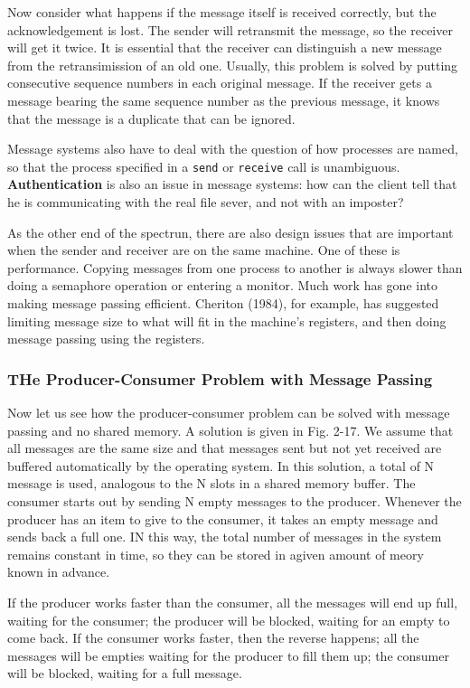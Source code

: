 \documentclass{book}
\newcommand {\kw}  [1] {\textbf{#1}}
\newcommand {\cmd} [1] {\texttt{#1}}
\begin{document}
Now consider what happens if the message itself is received correctly, but the acknowledgement is lost.
The sender will retransmit the message, so the receiver will get it twice.
It is essential that the receiver can distinguish a new message from the retransimission of an old one.
Usually, this problem is solved by putting consecutive sequence numbers in each original message.
If the receiver gets a message bearing the same sequence number as the previous message,
it knows that the message is a duplicate that can be ignored.

Message systems also have to deal with the question of how processes are named,
so that the process specified in a \cmd{send} or \cmd{receive} call is unambiguous.
\kw{Authentication} is also an issue in message systems:
how can the client tell that he is communicating with the real file sever, and not with an imposter?

As the other end of the spectrun, there are also design issues that are important when the sender and receiver are on the same machine.
One of these is performance.
Copying messages from one process to another is always slower than doing a semaphore operation or entering a monitor.
Much work has gone into making message passing efficient.
Cheriton (1984), for example, has suggested limiting message size to what will fit in the machine's registers,
and then doing message passing using the registers.

\subsubsection*{THe Producer-Consumer Problem with Message Passing}
Now let us see how the producer-consumer problem can be solved with message passing and no shared memory.
A solution is given in Fig. 2-17.
We assume that all messages are the same size and that messages sent but not yet received are buffered automatically by the operating system.
In this solution, a total of N message is used, analogous to the N slots in a shared memory buffer.
The consumer starts out by sending N empty messages to the producer.
Whenever the producer has an item to give to the consumer, it takes an empty message and sends back a full one.
IN this way, the total number of messages in the system remains constant in time, 
so they can be stored in agiven amount of meory known in advance.

If the producer works faster than the consumer, all the messages will end up full, waiting for the consumer;
the producer will be blocked, waiting for an empty to come back.
If the consumer works faster, then the reverse happens;
all the messages will be empties waiting for the producer to fill them up; the consumer will be blocked, waiting for a full message.
\end{document}
